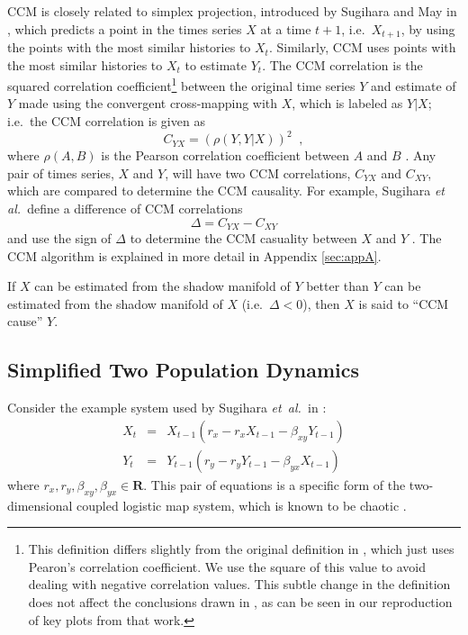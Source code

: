 \documentclass[a4paper,11pt]{article}
\begin{document}
CCM is closely related to simplex projection, introduced by Sugihara and May in \cite{otherSugref}, which predicts a point in the times series $X$ at a time $t+1$, i.e.\ $X_{t+1}$, by using the points with the most similar histories to $X_t$.  Similarly, CCM uses points with the most similar histories to $X_t$ to estimate $Y_t$.  The CCM correlation is the squared correlation coefficient\footnote{This definition differs slightly from the original definition in \cite{mainref}, which just uses Pearon's correlation coefficient.  We use the square of this value to avoid dealing with negative correlation values.  This subtle change in the definition does not affect the conclusions drawn in \cite{mainref}, as can be seen in our reproduction of key plots from that work.} between the original time series $Y$ and estimate of $Y$ made using the convergent cross-mapping with $X$, which is labeled as $Y|X$; i.e.\ the CCM correlation is given as 
$$
C_{YX} = \left(\rho\left(Y,Y|X\right)\right)^2\;\;,
$$
where $\rho(A,B)$ is the Pearson correlation coefficient between $A$ and $B$ \cite{}.  Any pair of times series, $X$ and $Y$, will have two CCM correlations, $C_{YX}$ and $C_{XY}$, which are compared to determine the CCM causality.  For example, Sugihara {\em et al.\ }define a difference of CCM correlations
\begin{equation}
\label{eqn:delta}
\Delta = C_{YX} - C_{XY}
\end{equation}
and use the sign of $\Delta$ to determine the CCM casuality between $X$ and $Y$ \cite{mainref}.  The CCM algorithm is explained in more detail in Appendix \ref{sec:appA}.

If $X$ can be estimated from the shadow manifold of $Y$ better than $Y$ can be estimated from the shadow manifold of $X$ (i.e.\ $\Delta < 0$), then $X$ is said to ``CCM cause'' $Y$.

\subsection{Simplified Two Population Dynamics}
\label{sec:2Pop}
Consider the example system used by Sugihara {\em et\ al.\ }in \cite{}:
\begin{eqnarray}
\label{eqn:2pop}
X_t &=& X_{t-1}\left(r_x-r_x X_{t-1}-\beta_{xy} Y_{t-1}\right)\\
Y_t &=& Y_{t-1}\left(r_y-r_y Y_{t-1}-\beta_{yx} X_{t-1}\right)
\end{eqnarray}
where $r_x,r_y,\beta_{xy},\beta_{yx}\in\mathbf{R}$.  This pair of equations is a specific form of the two-dimensional coupled logistic map system, which is known to be chaotic \cite{A. L. LLOYD 1995}.
\end{document}
